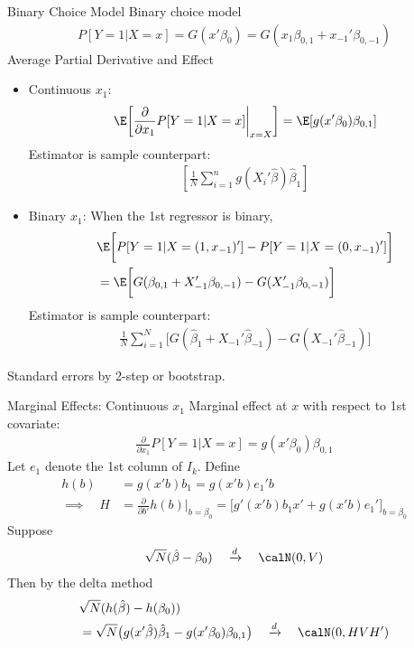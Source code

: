 \documentclass[handout]{beamer}
\newcommand{\dto}{\xrightarrow{d}}
\newcommand{\sumin}{\sum^n_{i=1}}
\newcommand{\sumiN}{\sum^N_{i=1}}
\begin{document}
\begin{frame}[shrink]{Binary Choice Model}
Binary choice model
\begin{align*}
  P[Y=1|X=x]
  =
  G(x'\beta_0)
  =
  G(x_1\beta_{0,1} + x_{-1}'\beta_{0,-1})
\end{align*}
\alert{Average Partial Derivative and Effect}
\begin{itemize}
  \item \alert{Continuous $x_1$}:
    \begin{align*}
      \E\bigg[
      \frac{\partial }{\partial x_1}
      P[Y=1|X=x]
      \bigg|_{x=X}
      \bigg]
      =
      \E[g(x'\beta_0)\beta_{0,1}]
    \end{align*}
    Estimator is sample counterpart:
    \begin{align*}
      \left[
        \frac{1}{N}
        \sumin
        g(X_i'\hat{\beta})\hat{\beta}_1
      \right]
    \end{align*}
  \item \alert{Binary $x_1$}:
    When the 1st regressor is binary,
    \begin{align*}
      &
      \E\bigg[
      P[Y=1|X=(1,x_{-1})']
      -
      P[Y=1|X=(0,x_{-1})']
      \bigg]
      \\
      &=
      \E\bigg[
      G(\beta_{0,1} + X_{-1}'\beta_{0,-1})
      -
      G(X_{-1}'\beta_{0,-1})
      \bigg]
    \end{align*}
    Estimator is sample counterpart:
    \begin{align*}
      \frac{1}{N}
      \sumiN
      \bigg[
      G(\hat{\beta}_{1} + X_{-1}'\hat{\beta}_{-1})
      -
      G(X_{-1}'\hat{\beta}_{-1})
      \bigg]
    \end{align*}

\end{itemize}
Standard errors by 2-step or bootstrap.
\end{frame}




\begin{frame}[shrink]{Marginal Effects: Continuous $x_1$}
Marginal effect at $x$ with respect to 1st covariate:
\begin{align*}
  \frac{\partial}{\partial x_1}
  P[Y=1|X=x]
  =
  g(x'\beta_0)\beta_{0,1}
\end{align*}
Let $e_1$ denote the 1st column of $I_k$.
Define
\begin{align*}
  h(b)&= g(x'b)b_1=g(x'b)e_1'b \\
  \implies\quad
  H
  &=
  \frac{\partial}{\partial b'}
  h(b)
  \big|_{b=\beta_0}
  =
  \big[
  g'(x'b)b_1x'
  +
  g(x'b)e_1'
  \big]_{b=\beta_0}
\end{align*}
Suppose
\begin{align*}
  \sqrt{N}(\hat{\beta}-\beta_0)
  \quad\dto\quad
  \calN(0,V)
\end{align*}
Then by the delta method
\begin{align*}
  &\sqrt{N}(h(\hat{\beta})-h(\beta_0))
  \\
  &=
  \sqrt{N}\big(
    g(x'\hat{\beta})\hat{\beta}_1-g(x'\beta_0)\beta_{0,1}
  \big)
  \quad\dto\quad
  \calN(0,HVH')
\end{align*}
\end{frame}
\end{document}
